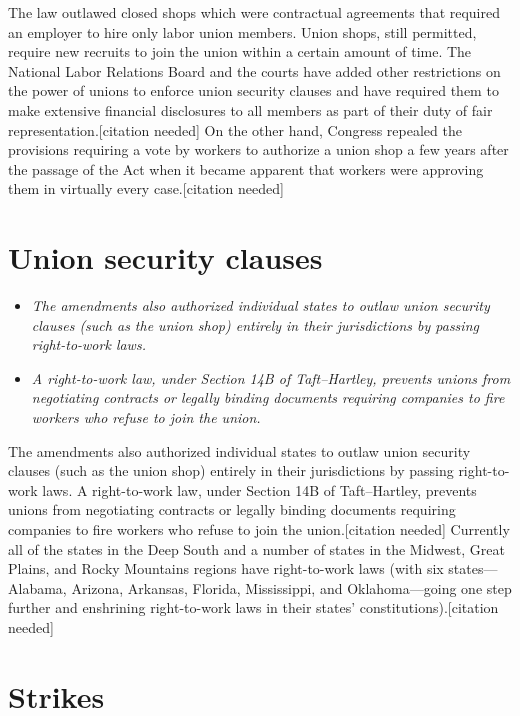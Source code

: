 The law outlawed closed shops which were contractual agreements that
required an employer to hire only labor union members. Union shops,
still permitted, require new recruits to join the union within a certain
amount of time. The National Labor Relations Board and the courts have
added other restrictions on the power of unions to enforce union
security clauses and have required them to make extensive financial
disclosures to all members as part of their duty of fair
representation.{[}citation needed{]} On the other hand, Congress
repealed the provisions requiring a vote by workers to authorize a union
shop a few years after the passage of the Act when it became apparent
that workers were approving them in virtually every case.{[}citation
needed{]}

\section{Union security clauses}\label{union-security-clauses}

\begin{itemize}
\item
  \emph{The amendments also authorized individual states to outlaw union
  security clauses (such as the union shop) entirely in their
  jurisdictions by passing right-to-work laws.}
\item
  \emph{A right-to-work law, under Section 14B of Taft--Hartley,
  prevents unions from negotiating contracts or legally binding
  documents requiring companies to fire workers who refuse to join the
  union.}
\end{itemize}

The amendments also authorized individual states to outlaw union
security clauses (such as the union shop) entirely in their
jurisdictions by passing right-to-work laws. A right-to-work law, under
Section 14B of Taft--Hartley, prevents unions from negotiating contracts
or legally binding documents requiring companies to fire workers who
refuse to join the union.{[}citation needed{]} Currently all of the
states in the Deep South and a number of states in the Midwest, Great
Plains, and Rocky Mountains regions have right-to-work laws (with six
states---Alabama, Arizona, Arkansas, Florida, Mississippi, and
Oklahoma---going one step further and enshrining right-to-work laws in
their states' constitutions).{[}citation needed{]}

\section{Strikes}\label{strikes}

